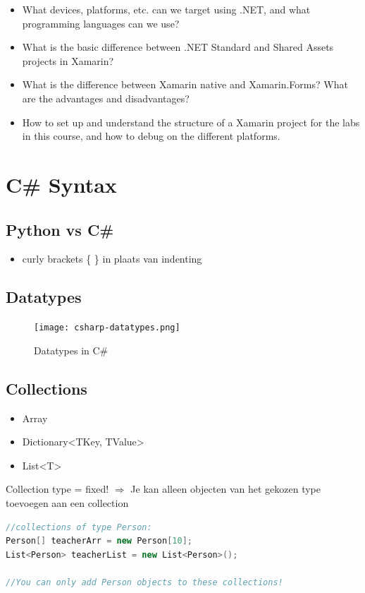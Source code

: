 \documentclass{article}
\begin{document}
\begin{itemize}
    \item What devices, platforms, etc. can we target using .NET, and what programming languages can we use?
    \item What is the basic difference between .NET Standard and Shared Assets projects in Xamarin?
    \item What is the difference between Xamarin native and Xamarin.Forms? What are the advantages and disadvantages?
    \item How to set up and understand the structure of a Xamarin project for the labs in this course, and how to debug on the different platforms.
\end{itemize}

\section{C\# Syntax}

\subsection{Python vs C\#}

\begin{itemize}
    \item curly brackets \{ \} in plaats van indenting
\end{itemize}

\subsection{Datatypes}
\begin{figure}[H]
    \centering
    \texttt{[image: csharp-datatypes.png]}
    \caption{Datatypes in C\#}
\end{figure}

\subsection{Collections}
\begin{itemize}
    \item Array
    \item Dictionary<TKey, TValue>
    \item List<T>
\end{itemize}

Collection type = fixed! $\Rightarrow$ Je kan alleen objecten van het gekozen type toevoegen aan een collection

\begin{lstlisting}[language=csharp]
//collections of type Person:
Person[] teacherArr = new Person[10];
List<Person> teacherList = new List<Person>();

//You can only add Person objects to these collections!
\end{lstlisting}
\end{document}
